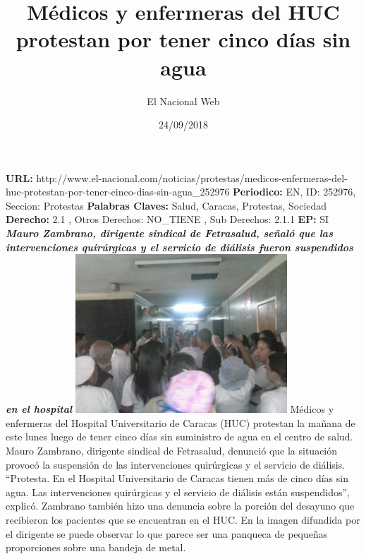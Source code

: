 \documentclass{article}%
\title{\textbf{Médicos y enfermeras del HUC protestan por tener cinco días sin agua}}%
\author{El Nacional Web}%
\date{24/09/2018}%
\begin{document}
%
\normalsize%
\maketitle%
\textbf{URL: }%
http://www.el{-}nacional.com/noticias/protestas/medicos{-}enfermeras{-}del{-}huc{-}protestan{-}por{-}tener{-}cinco{-}dias{-}sin{-}agua\_252976\newline%
%
\textbf{Periodico: }%
EN, %
ID: %
252976, %
Seccion: %
Protestas\newline%
%
\textbf{Palabras Claves: }%
Salud, Caracas, Protestas, Sociedad\newline%
%
\textbf{Derecho: }%
2.1%
, Otros Derechos: %
NO\_TIENE%
, Sub Derechos: %
2.1.1%
\newline%
%
\textbf{EP: }%
SI\newline%
\newline%
%
\textbf{\textit{Mauro Zambrano, dirigente sindical de Fetrasalud, señaló que las intervenciones quirúrgicas y el servicio de diálisis fueron suspendidos en el hospital}}%
\newline%
\newline%
%
\includegraphics[width=300px]{47.jpg}%
\newline%
%
Médicos y enfermeras del Hospital Universitario de Caracas (HUC) protestan la mañana de este lunes luego de tener cinco días sin suministro de agua en el centro de salud.%
\newline%
%
Mauro Zambrano, dirigente sindical de Fetrasalud, denunció que la situación provocó la suspensión de las intervenciones quirúrgicas y el servicio de diálisis.%
\newline%
%
“Protesta. En el Hospital Universitario de Caracas tienen más de cinco días sin agua. Las intervenciones quirúrgicas y el servicio de diálisis están suspendidos”, explicó.%
\newline%
%
Zambrano también hizo una denuncia sobre la porción del desayuno que recibieron los pacientes que se encuentran en el HUC. En la imagen difundida por el dirigente se puede observar lo que parece ser una panqueca de pequeñas proporciones sobre una bandeja de metal.%
\newline%
%
\end{document}
